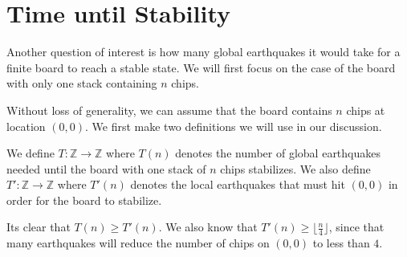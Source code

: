 \documentclass[runningheads,a4paper]{llncs}
\begin{document}
\section{Time until Stability}
\label{Time until Stability}


Another question of interest is how many global earthquakes it would take for a finite board to reach a stable state. We will first focus on the case of the board with only one stack containing $n$ chips. 

Without loss of generality, we can assume that the board contains $n$ chips at location $(0,0)$. We first make two definitions we will use in our discussion.
\begin{definition}
We define $T: \mathbb{Z} \rightarrow \mathbb{Z}$ where $T(n)$ denotes the number of global earthquakes needed until the board with one stack of $n$ chips stabilizes. We also define $T':\mathbb{Z} \rightarrow \mathbb{Z}$ where $T'(n)$ denotes the local earthquakes that must hit $(0,0)$ in order for the board to stabilize. 
\end{definition}
Its clear that $T(n) \geq T'(n)$. We also know that $T'(n) \geq \lfloor \frac{n}{4}\rfloor$, since that many earthquakes will reduce the number of chips on $(0,0)$ to less than $4$.
\end{document}
